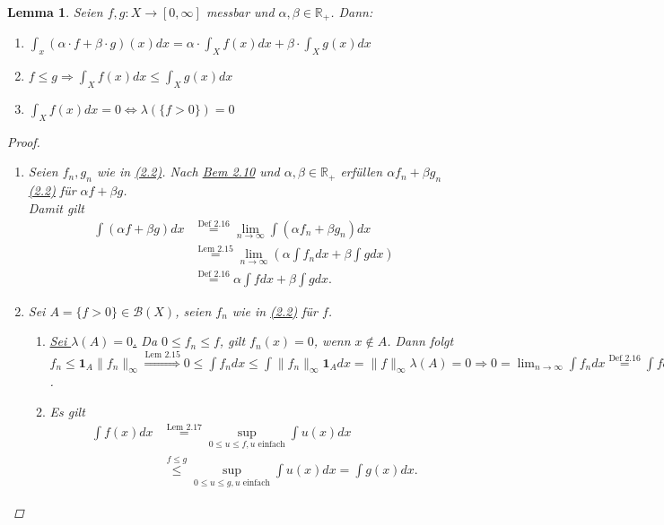 \documentclass[a4paper]{scrreprt}
\newcommand{\doubleOne}{\textbf{1}}
\newcommand{\R}{\mathbb{R}}
\newcommand{\Borel}{\mathcal{B}}
\newcommand{\toInf}{\rightarrow \infty}
\newcommand{\limToInf}[1]{\lim_{#1 \toInf}}
\newcommand{\jlabel}[1]{\label{j_#1}}
\newcommand{\jshortlink}[1]{\jhyperref{#1}{\text{#1}}}
\newcommand{\jhyperref}[2]{\hyperref[j_#1]{#2}}
\newcommand{\jlink}[1]{\jhyperref{#1}{#1}}
\theoremstyle{plain}
\newtheorem{lem}[thm]{Lemma}
\theoremstyle{definition}
\begin{document}
{{{\begin{lem}
\jlabel{Lem 2.18}
    Seien $f,g: X \rightarrow [0,\infty]$ messbar und $\alpha, \beta \in \R_+$. Dann:
    \begin{enumerate}
        \item $\int_x(\alpha\cdot f + \beta\cdot g)(x)dx = \alpha \cdot \int_X f(x) dx + \beta \cdot \int_X g(x) dx$
        \item $f \le g \Rightarrow \int_X f(x) dx \le \int_X g(x) dx$
        \item $\int_X f(x) dx = 0 \Leftrightarrow \lambda(\{f > 0\}) = 0$
    \end{enumerate}
    \begin{proof}
        \begin{enumerate}
            \item Seien $f_n,g_n$ wie in \jlink{(2.2)}. Nach \jlink{Bem 2.10} und $\alpha, \beta \in \R_+$ erfüllen $\alpha f_n + \beta g_n$ \jlink{(2.2)} für $\alpha f + \beta g$.\\
            Damit gilt
            \begin{displaymath}
                \begin{split}
                    \int(\alpha f + \beta g)dx &\overset{\jshortlink{Def 2.16}}{=} \limToInf{n} \int (\alpha f_n + \beta g_n)dx \\
                    &\overset{\jshortlink{Lem 2.15}}{=} \limToInf{n}(\alpha \int f_n dx + \beta \int g dx)\\
                    &\overset{\jshortlink{Def 2.16}}{=} \alpha \int fdx + \beta \int g dx.
                \end{split}
            \end{displaymath}
            \item Sei $A = \{f > 0\} \in \Borel(X)$, seien $f_n$ wie in \jlink{(2.2)} für $f$.
                \begin{enumerate}
                    \item
                        \uline{Sei $\lambda(A) = 0$.} Da $0 \le f_n \le f$, gilt $f_n(x)=0$, wenn $x \notin A$. Dann folgt $f_n \le \doubleOne_A \lVert f_n \rVert_\infty \overset{\jshortlink{Lem 2.15}}{\Rightarrow} 0 \le \int f_n dx \le \int \lVert f_n \rVert_\infty \doubleOne_A dx = \lVert f \rVert_\infty \lambda(A) = 0 \Rightarrow 0 = \limToInf{n} \int f_n dx \overset{\jshortlink{Def 2.16}}{=} \int f dx$.
                    \item Es gilt
                        \begin{displaymath}
                            \begin{split}
                                \int f(x)dx &\overset{\jshortlink{Lem 2.17}}{=} \sup_{0\le u\le f, u \text{ einfach}} \int u(x)dx\\
                                &\overset{f\le g}{\le} \sup_{0\le u\le g, u \text{ einfach}} \int u(x)dx = \int g(x) dx.
                            \end{split}
                        \end{displaymath} 


\end{enumerate}
\end{enumerate}
\end{proof}
\end{lem}}}}
\end{document}
